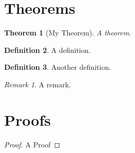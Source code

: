 \documentclass{article}
\newtheorem{theorem}{Theorem}[section]
\theoremstyle{definition}
\newtheorem{definition}[theorem]{Definition}
\theoremstyle{remark}
\newtheorem*{remark}{Remark} %
\begin{document}
\section{Theorems}
\begin{theorem}[My Theorem]
 A theorem.
\end{theorem}

\begin{definition}
 A definition.
\end{definition}

\begin{definition}
 Another definition.
\end{definition}

\begin{remark}
 A remark.
\end{remark}

\section{Proofs}
\begin{proof}
  A Proof
\end{proof}
\end{document}
